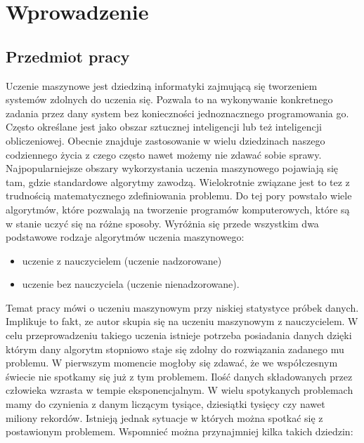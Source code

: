\section{Wprowadzenie}\label{intro}
\subsection{Przedmiot pracy}
Uczenie maszynowe jest dziedziną informatyki zajmującą się tworzeniem systemów zdolnych do uczenia się. Pozwala to na wykonywanie konkretnego zadania przez dany system bez konieczności jednoznacznego programowania go. 
Często określane jest jako obszar sztucznej inteligencji lub też inteligencji obliczeniowej\cite{stefanowski}. Obecnie znajduje zastosowanie w wielu dziedzinach naszego codziennego życia z czego często nawet możemy nie zdawać sobie sprawy.
Najpopularniejsze obszary wykorzystania uczenia maszynowego pojawiają się tam, gdzie standardowe algorytmy zawodzą. Wielokrotnie związane jest to tez z trudnością matematycznego zdefiniowania problemu. 
 Do tej pory powstało wiele algorytmów, które pozwalają na tworzenie programów komputerowych, które są w stanie uczyć się na różne sposoby. Wyróżnia się przede wszystkim dwa podstawowe rodzaje algorytmów uczenia maszynowego:
\begin{itemize}
\item uczenie z nauczycielem (uczenie nadzorowane)
\item uczenie bez nauczyciela (uczenie nienadzorowane).
\end{itemize}
Temat pracy mówi o uczeniu maszynowym przy niskiej statystyce próbek danych. Implikuje to fakt, ze autor skupia się na uczeniu maszynowym z nauczycielem. W celu przeprowadzeniu takiego uczenia istnieje potrzeba posiadania danych dzięki którym dany algorytm stopniowo staje się zdolny do rozwiązania zadanego mu problemu.
 W pierwszym momencie mogłoby się zdawać, że we współczesnym świecie nie spotkamy się już z tym problemem. Ilość danych składowanych przez człowieka wzrasta w tempie eksponencjalnym. W wielu spotykanych problemach mamy do czynienia z danym liczącym tysiące, dziesiątki tysięcy czy nawet miliony rekordów. Istnieją jednak sytuacje w których można spotkać się z postawionym problemem. Wspomnieć można przynajmniej kilka takich dziedzin:
